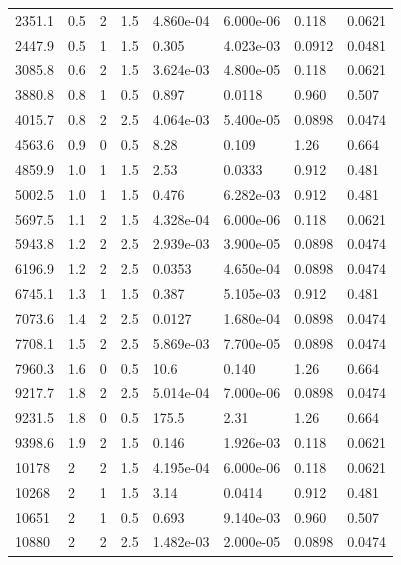 \documentclass[preview]{standalone}
\begin{document}
{{\begin{tabular}{L{1.2cm}C{1.2cm} C{0.3cm}C{0.5cm} C{1.4cm}C{1.4cm} C{1.4cm}C{1.4cm}}
  2351.1  &   0.5  & 2     & 1.5 &  4.860e-04  & 6.000e-06  & 0.118 &  0.0621   \\ 
  2447.9  &   0.5  & 1     & 1.5 &  0.305  & 4.023e-03  & 0.0912 &  0.0481   \\ 
  3085.8  &   0.6  & 2     & 1.5 &  3.624e-03  & 4.800e-05  & 0.118 &  0.0621   \\ 
  3880.8  &   0.8  & 1     & 0.5 &  0.897  & 0.0118  & 0.960 &  0.507   \\ 
  4015.7  &   0.8  & 2     & 2.5 &  4.064e-03  & 5.400e-05  & 0.0898 &  0.0474   \\ 
  4563.6  &   0.9  & 0     & 0.5 &  8.28  & 0.109  & 1.26 &  0.664   \\ 
  4859.9  &   1.0  & 1     & 1.5 &  2.53  & 0.0333  & 0.912 &  0.481   \\ 
  5002.5  &   1.0  & 1     & 1.5 &  0.476  & 6.282e-03  & 0.912 &  0.481   \\ 
  5697.5  &   1.1  & 2     & 1.5 &  4.328e-04  & 6.000e-06  & 0.118 &  0.0621   \\ 
  5943.8  &   1.2  & 2     & 2.5 &  2.939e-03  & 3.900e-05  & 0.0898 &  0.0474   \\ 
  6196.9  &   1.2  & 2     & 2.5 &  0.0353  & 4.650e-04  & 0.0898 &  0.0474   \\ 
  6745.1  &   1.3  & 1     & 1.5 &  0.387  & 5.105e-03  & 0.912 &  0.481   \\ 
  7073.6  &   1.4  & 2     & 2.5 &  0.0127  & 1.680e-04  & 0.0898 &  0.0474   \\ 
  7708.1  &   1.5  & 2     & 2.5 &  5.869e-03  & 7.700e-05  & 0.0898 &  0.0474   \\ 
  7960.3  &   1.6  & 0     & 0.5 &  10.6  & 0.140  & 1.26 &  0.664   \\ 
  9217.7  &   1.8  & 2     & 2.5 &  5.014e-04  & 7.000e-06  & 0.0898 &  0.0474   \\ 
  9231.5  &   1.8  & 0     & 0.5 &  175.5  & 2.31  & 1.26 &  0.664   \\ 
  9398.6  &   1.9  & 2     & 1.5 &  0.146  & 1.926e-03  & 0.118 &  0.0621   \\ 
  10178  &     2  & 2     & 1.5 &  4.195e-04  & 6.000e-06  & 0.118 &  0.0621   \\ 
  10268  &     2  & 1     & 1.5 &  3.14  & 0.0414  & 0.912 &  0.481   \\ 
  10651  &     2  & 1     & 0.5 &  0.693  & 9.140e-03  & 0.960 &  0.507   \\ 
  10880  &     2  & 2     & 2.5 &  1.482e-03  & 2.000e-05  & 0.0898 &  0.0474   \\ 

\end{tabular}}}
\end{document}
